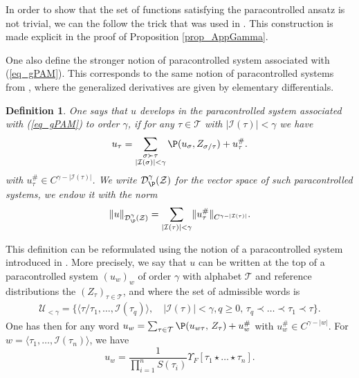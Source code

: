 \documentclass[11pt]{preprint}
\def\CT{\mathcal{T}}
\newcommand{\mcU}{\mathcal{U}}
\newcommand{\mcI}{\mathcal{I}}
\newcommand{\mcD}{\mathcal{D}}
\newcommand{\mcZ}{\mathcal{Z}}
\newcommand{\mcT}{\mathcal{T}}
\newcounter{theorem}
\newtheorem{defi}[theorem]{Definition}
\def\eqref#1{(\ref{#1})}
\renewcommand{\lg}{\langle}
\newcommand{\rg}{\rangle}
\newcommand{\norme}[1]{\left\lVert #1 \right\lVert}
\begin{document}
	\begin{remark}
		In order to show that the set of functions satisfying the paracontrolled ansatz is not trivial, we can the follow the trick that was used in \cite[Lemma 4.12]{AllezChouk}. This construction is made explicit in the proof of Proposition \ref{prop_AppGamma}. 
	\end{remark}
	
	One also define the stronger notion of paracontrolled system associated with \eqref{eq_gPAM}. This corresponds to the same notion of paracontrolled systems from \cite{BailleulBernicotHighOrder}, where the generalized derivatives are given by elementary differentials.
	
	\begin{defi}\label{def_PAMparacSystem}
		One says that $u$ develops in the  paracontrolled system associated with \eqref{eq_gPAM} to order $\gamma$, if for any $\tau\in\mcT$ with $|\mcI(\tau)|<\gamma$ we have 
		$$
		u_\tau = \sum_{\substack{\sigma\succ\tau \\ |\mcI(\sigma)|<\gamma}} \P(u_\sigma,Z_{\sigma/\tau} ) + u_\tau^\#.
		$$
		with $u_\tau^\# \in C^{\gamma-|\mcI(\tau)|}$.
			We write $\mcD^\gamma_\P(\mcZ)$ for the vector space of such paracontrolled systems, we endow it with the norm
		$$
		\norme{u}_{\mcD^\gamma_\P(\mcZ)} = \sum_{\substack{|\mcI(\tau)|<\gamma} } \lVert u_\tau^\#\lVert_{C^{\gamma-|\mcI(\tau)|}}.
		$$
		\end{defi}
		
		
		
		
		This definition can be reformulated using the notion of a paracontrolled system introduced in \cite[Section 1.3]{LocalExpansionsParacSystems}. More precisely, we say that $u$ can be written at the top of a paracontrolled system $(u_w)_w$ of order $\gamma$ with alphabet $\mcT$ and reference distributions the $(Z_\tau)_{\tau\in\mcT}$, and where the set of admissible words is
		\begin{align*}
			\mcU_{<\gamma} = \big\{ \lg\tau/\tau_1,\dots, \mcI(\tau_q) \rg , \quad |\mcI(\tau)|<\gamma, q\geq 0, \, \tau_q\prec\dots\prec\tau_1\prec \tau   \big\}. 
		\end{align*}
		One has then for any word
		$
			u_{w} = \sum_{\tau \in \CT} \P(u_{w \tau} , \, Z_{\tau} ) + u^\#_w
		$
		with $ u^\#_w \in C^{\gamma - |w|} $.
		For $w=\lg \tau_1, \dots, \mcI(\tau_n) \rg $, we have $$u_w= 
		\frac{1}{\prod_{i=1}^n S(\tau_i)} \Upsilon_F[  \tau_1 \star \dots \star \tau_n].
		$$
		
\end{document}
